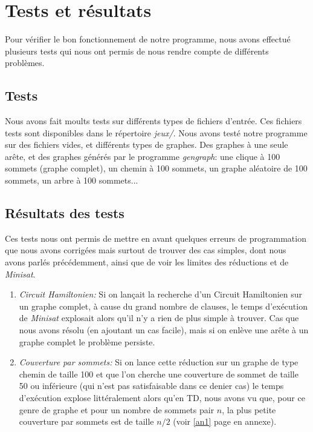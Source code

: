  \section{Tests et résultats}
  Pour vérifier le bon fonctionnement de notre programme, nous avons
  effectué plusieurs tests qui nous ont permis de nous rendre compte de
  différents problèmes.

  \subsection{Tests}
  Nous avons fait moults tests sur différents types de fichiers
  d'entrée. Ces fichiers tests sont disponibles dans le répertoire 
  \emph{jeux/}. \newline
  \indent Nous avons testé notre programme sur des fichiers vides,
  et différents types de graphes. Des graphes à une seule arête, et des
  graphes générés par le programme \emph{gengraph}: une clique à 100
  sommets (graphe complet), un chemin à 100 sommets, un graphe aléatoire
  de 100 sommets, un arbre à 100 sommets...

  \subsection{Résultats des tests}
  Ces tests nous ont permis de mettre en avant quelques erreurs de
  programmation que nous avons corrigées mais surtout de trouver des cas
  simples, dont nous avons parlés précédemment, ainsi que de voir les
  limites des réductions et de \emph{Minisat}.
  \begin{enumerate}
   \item \emph{Circuit Hamiltonien:} Si on lançait la recherche d'un
	 Circuit Hamiltonien sur un graphe complet, à cause du grand
	 nombre de clauses, le temps d'exécution de \emph{Minisat}
	 explosait alors qu'il n'y a rien de plus simple à trouver. Cas
	 que nous avons résolu (en ajoutant un cas facile), mais si on
	 enlève une arête à un graphe complet le problème persiste.
   \item \emph{Couverture par sommets:} Si on lance cette réduction sur
	 un graphe de type chemin de taille 100 et que l'on cherche une
	 couverture de sommet de taille 50 ou inférieure (qui n'est pas
	 satisfaisable dans ce denier cas) le temps d'exécution explose
	 littéralement alors qu'en TD, nous avons vu que, pour ce genre
	 de graphe et pour un nombre de sommets pair $n$, la plus petite
	 couverture par sommets est de taille $n/2$ (voir \ref{an1} page
	 \pageref{an1} en annexe).
  \end{enumerate}

